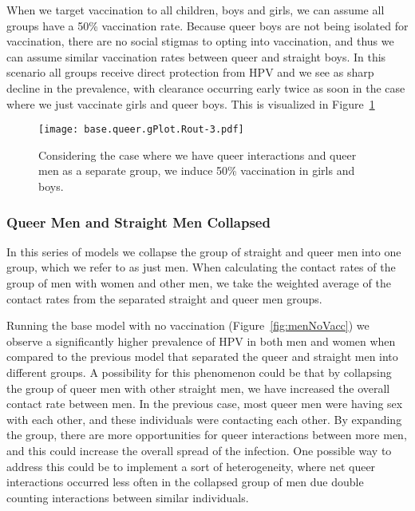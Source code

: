 \documentclass[12pt]{article}
\begin{document}
When we target vaccination to all children, boys and girls, we can assume all groups have a 50\% vaccination rate.  Because queer boys are not being isolated for vaccination, there are no social stigmas to opting into vaccination, and thus we can assume similar vaccination rates between queer and straight boys.  In this scenario all groups receive direct protection from HPV and we see as sharp decline in the prevalence, with clearance occurring early twice as soon in the case where we just vaccinate girls and queer boys.  This is visualized in Figure~\ref{queerVaccAll}

\begin{figure}[h!]
\begin{center}
\texttt{[image: base.queer.gPlot.Rout-3.pdf]}
\caption{Considering the case where we have queer interactions and queer men as a separate group, we induce 50\% vaccination in girls and boys.}
\label{queerVaccAll}
\end{center}
\end{figure}

\subsubsection{Queer Men and Straight Men Collapsed}

In this series of models we collapse the group of straight and queer men into one group, which we refer to as just men.  When calculating the contact rates of the group of men with women and other men, we take the weighted average of the contact rates from the separated straight and queer men groups.  

Running the base model with no vaccination (Figure~\ref{fig:menNoVacc}) we observe a significantly higher prevalence of HPV in both men and women when compared to the previous model that separated the queer and straight men into different groups.  A possibility for this phenomenon could be that by collapsing the group of queer men with other straight men, we have increased the overall contact rate between men.  In the previous case, most queer men were having sex with each other, and these individuals were contacting each other.  By expanding the group, there are more opportunities for queer interactions between more men, and this could increase the overall spread of the infection.  One possible way to address this could be to implement a sort of heterogeneity, where net queer interactions occurred less often in the collapsed group of men due double counting interactions between similar individuals.
\end{document}

